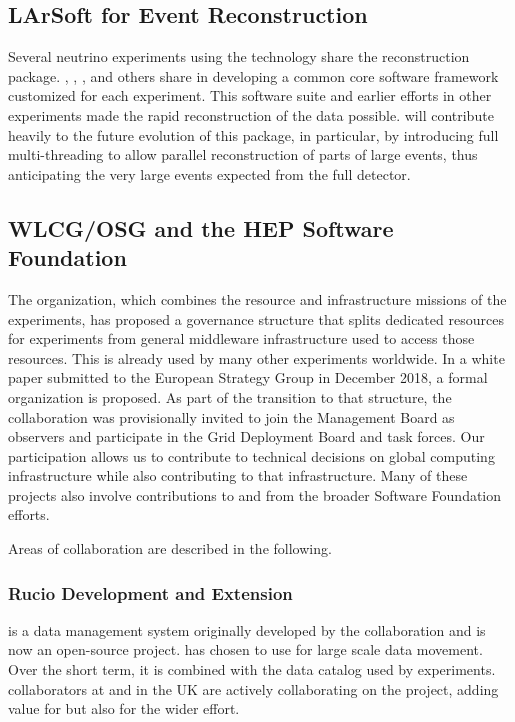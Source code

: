 \subsection{LArSoft for Event Reconstruction}

Several neutrino experiments using the  technology share the \cite{Snider:2017wjd} reconstruction package.  , , , and others share in developing a common core software framework customized for each experiment. This software suite and earlier efforts in other experiments made the rapid reconstruction of the  data possible.   will contribute heavily to  the future evolution of this package, in particular, by introducing full multi-threading to allow parallel reconstruction of parts of large events, thus anticipating the very large events expected from the full detector. 

\subsection{WLCG/OSG and the HEP Software Foundation}
The  \cite{Bird:2014ctt} organization, which combines the resource and infrastructure missions of the  experiments, has proposed a governance structure that splits dedicated resources for  experiments from general middleware infrastructure used to access those resources.  This  is already used by many other experiments worldwide.  In a white paper submitted to the European Strategy Group in December 2018\cite{bib:BirdEUStrategy}, a formal  organization is proposed. As part of the transition to that structure, the  collaboration was provisionally invited to join the  Management Board as observers and participate in the Grid Deployment Board and task forces. Our participation allows us to contribute to technical decisions on global computing infrastructure while also contributing to that infrastructure. 
Many of these projects also involve contributions to and from the broader  Software Foundation efforts. 

Areas of collaboration are described in the following. 

\subsubsection{Rucio Development and Extension}

 \cite{Barisits:2019fyl}
is a data management system originally developed by the  collaboration and is now an open-source project.   has chosen to use  for large scale data movement.  Over the short term, it is combined with the  data catalog used by  experiments.   collaborators at  and in the UK are actively collaborating on the  project, adding value for  but also for the wider effort.


